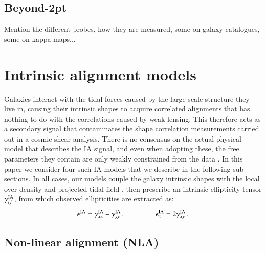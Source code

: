 \documentclass[useAMS,usenatbib]{mn2e}
\begin{document}
\subsection{Beyond-2pt}
\label{subsec:beyond-2pt}

 Mention the different probes, how they are measured, some on galaxy catalogues, some on kappa maps...
 
 \section{Intrinsic alignment models}
 \label{sec:IA_th}
 
Galaxies interact with the tidal forces caused by the large-scale structure  they live in, causing their intrinsic shapes to acquire correlated alignments that has nothing to do with the correlations caused by weak lensing. This therefore acts as a secondary signal that contaminates the shape correlation measurements carried out in a cosmic shear analysis. There is no consensus on the actual physical model that describes the IA signal, and even when adopting these, the free parameters they contain are only weakly constrained from the data \citep[see][for a review]{IA_review}.  %
In this paper we consider four such IA models that we describe in the following sub-sections. In all cases, our models couple the galaxy intrinsic shapes with the local over-density and projected tidal field , then prescribe an intrinsic ellipticity tensor $\gamma_{ij}^{\rm IA}$, from which observed ellipticities are extracted as:
 \begin{eqnarray}
\epsilon_{1}^{\rm IA} = \gamma_{xx}^{\rm IA} - \gamma_{yy}^{\rm IA} \, , \hspace{1.5cm}\epsilon_{2}^{\rm IA} = 2 \gamma_{xy}^{\rm IA}\, .
\label{eq:tidal_th_deltaNLA}
\end{eqnarray}


 
\subsection{Non-linear alignment (NLA)}
\end{document}
